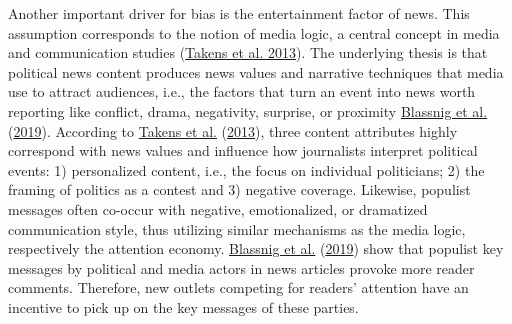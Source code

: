 \documentclass[
  12pt,
]{article}
\begin{document}
Another important driver for bias is the entertainment factor of news.
This assumption corresponds to the notion of media logic, a central
concept in media and communication studies
(\protect\hyperlink{ref-takens_media_2013}{Takens et al. 2013}). The
underlying thesis is that political news content produces news values
and narrative techniques that media use to attract audiences, i.e., the
factors that turn an event into news worth reporting like conflict,
drama, negativity, surprise, or proximity
\protect\hyperlink{ref-blassnig_hitting_2019}{Blassnig et al.}
(\protect\hyperlink{ref-blassnig_hitting_2019}{2019}). According to
\protect\hyperlink{ref-takens_media_2013}{Takens et al.}
(\protect\hyperlink{ref-takens_media_2013}{2013}), three content
attributes highly correspond with news values and influence how
journalists interpret political events: 1) personalized content, i.e.,
the focus on individual politicians; 2) the framing of politics as a
contest and 3) negative coverage. Likewise, populist messages often
co-occur with negative, emotionalized, or dramatized communication
style, thus utilizing similar mechanisms as the media logic,
respectively the attention economy.
\protect\hyperlink{ref-blassnig_hitting_2019}{Blassnig et al.}
(\protect\hyperlink{ref-blassnig_hitting_2019}{2019}) show that populist
key messages by political and media actors in news articles provoke more
reader comments. Therefore, new outlets competing for readers' attention
have an incentive to pick up on the key messages of these parties.
\end{document}
